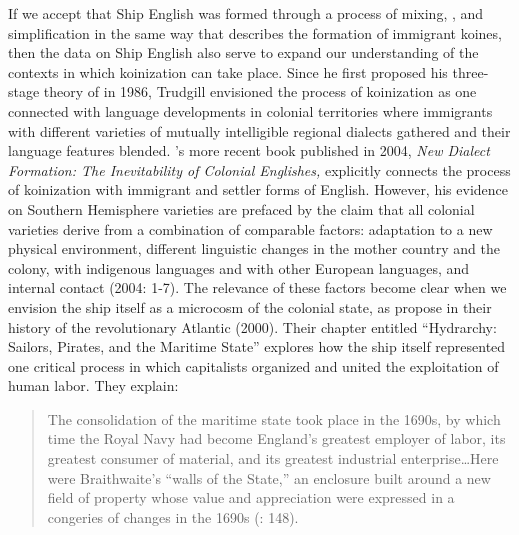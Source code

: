 If we accept that Ship English was formed through a process of  mixing, , and simplification in the same way that \citet{Trudgill1986} describes the formation of immigrant koines, then the data on Ship English also serve to expand our understanding of the contexts in which koinization can take place. Since he first proposed his three-stage theory of  in 1986, Trudgill envisioned the process of koinization as one connected with language developments in colonial territories where immigrants with different varieties of mutually intelligible regional dialects gathered and their language features blended. \citeauthor{Trudgill2004}’s more recent book published in 2004, \textit{New Dialect Formation: The Inevitability of Colonial Englishes,} explicitly connects the process of koinization with immigrant and settler forms of English. However, his evidence on Southern Hemisphere varieties are prefaced by the claim that all colonial varieties derive from a combination of comparable factors: adaptation to a new physical environment, different linguistic changes in the mother country and the colony,  with indigenous languages and with other European languages, and internal  contact (2004: 1-7). The relevance of these factors become clear when we envision the ship itself as a microcosm of the colonial state, as \citeauthor{LinebaughRediker2000} propose in their history of the revolutionary Atlantic (2000). Their chapter entitled “Hydrarchy: Sailors, Pirates, and the Maritime State” explores how the ship itself represented one critical process in which capitalists organized and united the exploitation of human labor. They explain:

\begin{quotation}
The consolidation of the maritime state took place in the 1690s, by which time the Royal Navy had become England’s greatest employer of labor, its greatest consumer of material, and its greatest industrial enterprise…Here were Braithwaite’s “walls of the State,” an enclosure built around a new field of property whose value and appreciation were expressed in a congeries of changes in the 1690s (\citealt{LinebaughRediker2004}: 148).
\end{quotation}

